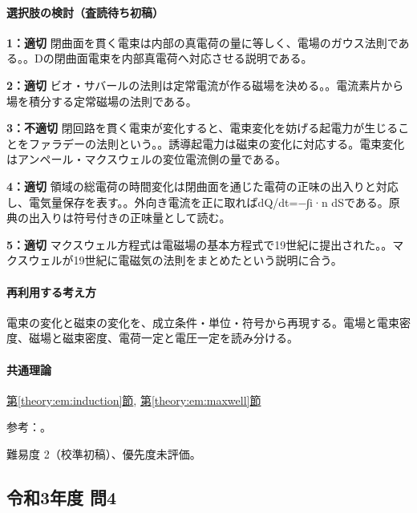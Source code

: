 \paragraph{選択肢の検討（査読待ち初稿）}\mbox{}\par

\noindent\textbf{1：適切} 閉曲面を貫く電束は内部の真電荷の量に等しく、電場のガウス法則である。。Dの閉曲面電束を内部真電荷へ対応させる説明である。\par

\noindent\textbf{2：適切} ビオ・サバールの法則は定常電流が作る磁場を決める。。電流素片から場を積分する定常磁場の法則である。\par

\noindent\textbf{3：不適切} 閉回路を貫く電束が変化すると、電束変化を妨げる起電力が生じることをファラデーの法則という。。誘導起電力は磁束の変化に対応する。電束変化はアンペール・マクスウェルの変位電流側の量である。\par

\noindent\textbf{4：適切} 領域の総電荷の時間変化は閉曲面を通じた電荷の正味の出入りと対応し、電気量保存を表す。。外向き電流を正に取ればdQ/dt=−∫i·n dSである。原典の出入りは符号付きの正味量として読む。\par

\noindent\textbf{5：適切} マクスウェル方程式は電磁場の基本方程式で19世紀に提出された。。マクスウェルが19世紀に電磁気の法則をまとめたという説明に合う。\par

\paragraph{再利用する考え方} 電束の変化と磁束の変化を、成立条件・単位・符号から再現する。電場と電束密度、磁場と磁束密度、電荷一定と電圧一定を読み分ける。

\paragraph{共通理論} \hyperref[theory:em:induction]{第\ref*{theory:em:induction}節}, \hyperref[theory:em:maxwell]{第\ref*{theory:em:maxwell}節}

\par 参考：\cite{mit_em10,mit_em13}。

\par 難易度 2（校準初稿）、優先度未評価。

\subsection{令和3年度 問4}
\label{q:r03-reg-applied-04}

